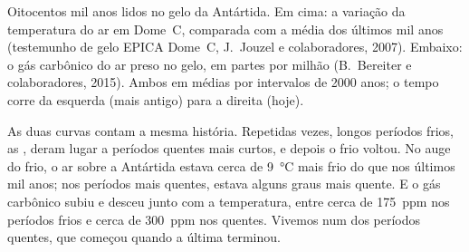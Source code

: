 \begin{omfigure}

{\small Oitocentos mil anos lidos no gelo da Antártida. Em cima: a
variação da temperatura do ar em Dome~C, comparada com a média dos
últimos mil anos (testemunho de gelo EPICA Dome~C, J.~Jouzel e
colaboradores, 2007). Embaixo: o gás carbônico do ar preso no gelo, em
partes por milhão (B.~Bereiter e colaboradores, 2015). Ambos em médias
por intervalos de \num{2000} anos; o tempo corre da esquerda (mais
antigo) para a direita (hoje).}
\label{fig:g9:climate-past-and-present:icecore}
\end{omfigure}

As duas curvas contam a mesma história. Repetidas vezes, longos períodos
frios, as , deram lugar a períodos quentes mais curtos, e depois
o frio voltou. No auge do frio, o ar sobre a Antártida estava cerca de
\qty{9}{\degreeCelsius} mais frio do que nos últimos mil anos; nos
períodos mais quentes, estava alguns graus mais quente. E o gás carbônico
subiu e desceu junto com a temperatura, entre cerca de \qty{175}{ppm} nos
períodos frios e cerca de \qty{300}{ppm} nos quentes. Vivemos num dos
períodos quentes, que começou quando a última  terminou.

